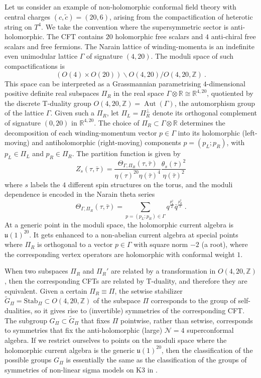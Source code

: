 \documentclass[11pt,reqno]{article}
\newcommand{\be}{\begin{equation}}
\newcommand{\ee}{\end{equation}}
\newcommand{\CN}{\mathcal{N}}
\DeclareMathOperator{\Aut}{Aut}
\newcommand{\ZZ}{\mathbb{Z}}
\newcommand{\RR}{\mathbb{R}}
\newcommand{\alg}[1]{\mathfrak{#1}}
\begin{document}
Let us consider an example of non-holomorphic conformal field theory with central charges $(c,\tilde c)=(20,6)$, arising from the compactification of heterotic string on $T^4$. We take the convention where the supersymmetric sector is anti-holomorphic. The CFT contains $20$ holomorphic free scalars and $4$ anti-chiral free scalars and free fermions. The Narain lattice of winding-momenta is an indefinite even unimodular lattice $\Gamma$ of signature $(4,20)$. The moduli space of such compactifications is
\be (O(4)\times O(20))\backslash O(4,20)/O(4,20,\ZZ)\ .
\ee This space can be interpreted as a Grassmannian parametrising $4$-dimensional positive definite real subspaces $\Pi_R$ in the real space $\Gamma\otimes \RR\cong \RR^{4,20}$, quotiented by the discrete T-duality group $O(4,20,\ZZ)=\Aut(\Gamma)$, the automorphism group of the lattice $\Gamma$. Given such a $\Pi_R$, let $\Pi_L=\Pi_R^\perp$ denote its orthogonal complement of signature $(0,20)$ in $\RR^{4,20}$. The choice of $\Pi_R\subset \Gamma\otimes\RR$ determines the decomposition of each winding-momentum vector $p\in \Gamma$ into its holomorphic (left-moving) and antiholomorphic (right-moving) components $p=(p_L;p_R)$, with $p_L\in \Pi_L$ and $p_R\in \Pi_R$. The partition function is given by
\be Z_s(\tau,\bar\tau)=\frac{\Theta_{\Gamma,\Pi_R}(\tau,\bar\tau)}{\eta(\tau)^{20}\eta(\bar\tau)^4}\frac{\theta_s(\bar\tau)^2}{\eta(\bar\tau)^2}
\ee where $s$ labels the $4$ different spin structures on the torus, and the moduli dependence is encoded in the Narain theta series
\be \Theta_{\Gamma,\Pi_R}(\tau,\bar\tau)=\sum_{p=(p_L;p_R)\in \Gamma}q^{\frac{p_L^2}{2}}\bar q^{\frac{p_R^2}{2}}\ .
\ee At a generic point in the moduli space, the holomorphic current algebra is $\alg{u}(1)^{20}$. It gets enhanced to a non-abelian current algebra at special points where $\Pi_R$ is orthogonal to a vector $p\in \Gamma$ with square norm $-2$ (a root), where the corresponding vertex operators are holomorphic with conformal weight $1$.

When two subspaces $\Pi_R$ and $\Pi_R'$ are related by a transformation in $O(4,20,\ZZ)$, then the corresponding CFTs are related by T-duality, and therefore they are equivalent. Given a certain $\Pi_R\equiv\Pi $, the setwise stabilizer $\tilde G_{\Pi}=\mathrm{Stab}_\Pi\subset O(4,20,\ZZ)$ of the subspace $\Pi$ corresponds to the group of self-dualities, so it gives rise to (invertible) symmetries of the corresponding CFT. The subgroup $G_\Pi\subset \tilde G_\Pi$ that fixes $\Pi$ pointwise, rather than setwise, corresponds to symmetries that fix the anti-holomorphic (large) $\CN=4$ superconformal algebra. If we restrict ourselves to points on the moduli space where the holomorphic current algebra is the generic $\alg{u}(1)^{20}$, then the classification of the possible groups $G_\Pi$ is essentially the same as the classification of the groups of symmetries of non-linear sigma models on K3 in \cite{Gaberdiel:2011fg}. 
\end{document}
